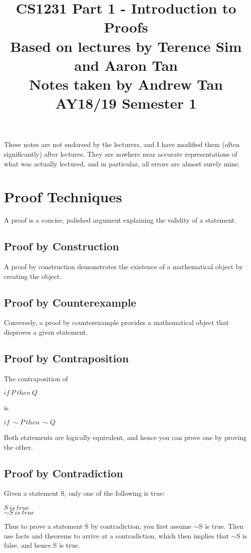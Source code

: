 \documentclass[a4paper]{article}
\title{%
	CS1231 Part 1 - Introduction to Proofs \\
	\large Based on lectures by Terence Sim and Aaron Tan
	\\ Notes taken by Andrew Tan
	\\ AY18/19 Semester 1
	\\ }
\author{}
\date{\vspace{-5ex}}
\begin{document}
\maketitle

\begin{center}\begin{minipage}[c]{0.9\textwidth}\centering\footnotesize These notes are not endorsed by the lecturers, and I have modified them (often significantly) after lectures. They are nowhere near accurate representations of what was actually lectured, and in particular, all errors are almost surely mine.\end{minipage}\end{center}

\section{Proof Techniques}
A proof is a concise, polished argument explaining the validity of a statement.
\subsection{Proof by Construction}
A proof by construction demonstrates the existence of a mathematical object by creating the object.
\subsection{Proof by Counterexample}
Conversely, a proof by counterexample provides a mathematical object that disproves a given statement.
\subsection{Proof by Contraposition}
The contraposition of \begin{center}$if\ P\ then\ Q$\end{center} is \begin{center}$if\ \sim P\ then\ \sim Q$\end{center}
Both statements are logically equivalent, and hence you can prove one by proving the other.
\subsection{Proof by Contradiction}
Given a statement S, only one of the following is true:
\begin{center}$S\ is\ true$\\$ \sim S\ is\ true$\end{center}
Thus to prove a statement S by contradiction, you first assume $\sim$S is true. Then use facts and theorems to arrive at a contradiction, which then implies that $\sim$S is false, and hence S is true.
\end{document}
